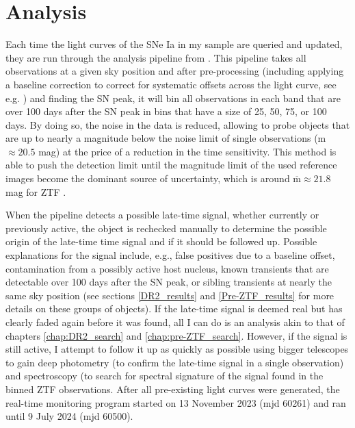 \documentclass[a4paper,oneside,12pt, class=Latex/Classes/PhDthesisPSnPDF, crop=false]{standalone}
\begin{document}
\section{Analysis}
\label{analysis}
Each time the light curves of the SNe Ia in my sample are queried and updated, they are run through the analysis pipeline from \citet{Terwel_2024_paper1}. This pipeline takes all observations at a given sky position and after pre-processing (including applying a baseline correction to correct for systematic offsets across the light curve, see e.g. \citealt{Yao_baseline_corr, Miller_baseline_corr}) and finding the SN peak, it will bin all observations in each band that are over 100 days after the SN peak in bins that have a size of 25, 50, 75, or 100 days. By doing so, the noise in the data is reduced, allowing to probe objects that are up to nearly a magnitude below the noise limit of single observations (m $\approx20.5$ mag) at the price of a reduction in the time sensitivity. This method is able to push the detection limit until the magnitude limit of the used reference images become the dominant source of uncertainty, which is around $\overline{\text{m}} \approx21.8$ mag for ZTF \citep{ref_uncert}.

When the pipeline detects a possible late-time signal, whether currently or previously active, the object is rechecked manually to determine the possible origin of the late-time time signal and if it should be followed up. Possible explanations for the signal include, e.g., false positives due to a baseline offset, contamination from a possibly active host nucleus, known transients that are detectable over 100 days after the SN peak, or sibling transients at nearly the same sky position (see sections \ref{DR2_results} and \ref{Pre-ZTF_results} for more details on these groups of objects). If the late-time signal is deemed real but has clearly faded again before it was found, all I can do is an analysis akin to that of chapters \ref{chap:DR2_search} and \ref{chap:pre-ZTF_search}. However, if the signal is still active, I attempt to follow it up as quickly as possible using bigger telescopes to gain deep photometry (to confirm the late-time signal in a single observation) and spectroscopy (to search for spectral signature of the signal found in the binned ZTF observations. After all pre-existing light curves were generated, the real-time monitoring program started on 13 November 2023 (mjd 60261) and ran until 9 July 2024 (mjd 60500).
\end{document}
